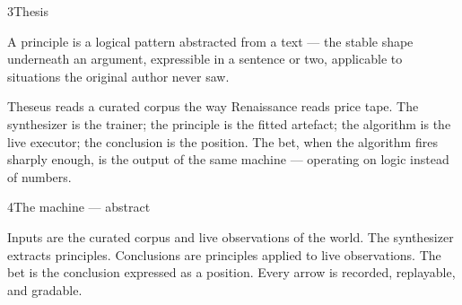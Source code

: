 \documentclass[10pt]{article}
\begin{document}
\begin{slide}{3}{Thesis}
  \sliderule

  A principle is a logical pattern abstracted from a text --- the
  stable shape underneath an argument, expressible in a sentence or
  two, applicable to situations the original author never saw.

  \vspace{0.2in}

  Theseus reads a curated corpus the way Renaissance reads price
  tape. The synthesizer is the trainer; the principle is the fitted
  artefact; the algorithm is the live executor; the conclusion is the
  position. The bet, when the algorithm fires sharply enough, is the
  output of the same machine --- operating on logic instead of
  numbers.

  \vspace{0.2in}

\end{slide}

\begin{slide}{4}{The machine — abstract}
  \sliderule

  \vspace{0.15in}

  \begin{center}
  \end{center}

  \vspace{0.3in}

  Inputs are the curated corpus and live observations of the world.
  The synthesizer extracts principles. Conclusions are principles
  applied to live observations. The bet is the conclusion expressed
  as a position. Every arrow is recorded, replayable, and gradable.
\end{slide}
\end{document}
